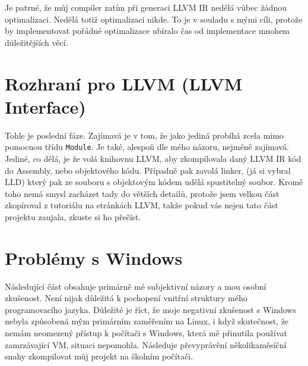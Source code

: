 \documentclass[12pt, a4paper, titlepage, abstract=on]{scrreprt}
\begin{document}
Je patrné, že můj compiler zatím při generaci LLVM IR nedělá vůbec žádnou optimalizaci. Nedělá totiž optimalizaci nikde. To je v souladu
s mými cíli, protože by implementovat pořádné optimalizace ubíralo čas od implementace mnohem důležitějších věcí.

\section{Rozhraní pro LLVM (LLVM Interface)}
Tohle je poslední fáze. Zajímavá je v tom, že jako jediná probíhá zcela mimo pomocnou třídu \texttt{Module}. Je také, alespoň dle mého názoru,
nejméně zajímavá. Jediné, co dělá, je že volá knihovnu LLVM, aby zkompilovala daný LLVM IR kód do Assembly, nebo objektového kódu. Případně
pak zavolá linker, (já si vybral LLD) který pak ze souboru s objektovým kódem udělá spustitelný soubor. Kromě toho nemá smysl zacházet tady do větších detailů, protože jsem velkou část zkopíroval z tutoriálu na stránkách LLVM\cite{llvm_tutorial}, takže pokud vás nejen tato část projektu zaujala, zkuste si ho přečíst.


\section{Problémy s Windows}
Následující část obsahuje primárně mé subjektivní názory a mou osobní zkušenost. Není nijak důležitá k pochopení vnitřní struktury mého
programovacího jazyka. Důležité je říct, že moje negativní zkušenost s Windows nebyla způsobená mým primárním zaměřením na Linux,
i když skutečnost, že nemám neomezený přístup k počítači s Windows, která mě přinutila používat zamrzávající VM, situaci nepomohla.
Následuje převyprávění několikaměsíční snahy zkompilovat můj projekt na školním počítači.
\end{document}
